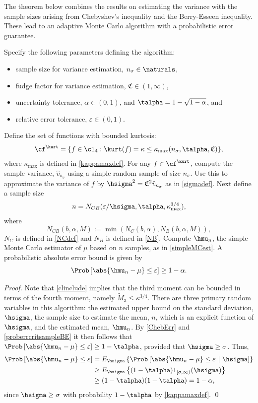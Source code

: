 \documentclass[graybox]{svmult}
\newcommand{\hv}{\hat{v}}
\newcommand{\fudge}{\mathfrak{C}}
\begin{document}
The theorem below combines the results on estimating the variance with the sample sizes arising from Chebyshev's inequality and the Berry-Esseen inequality.  These lead to an adaptive Monte Carlo algorithm with a probabilistic error guarantee.

\begin{theorem} \label{mainadaptthm} Specify the following parameters defining the algorithm:
\begin{itemize}
\item sample size for variance estimation, $n_{\sigma} \in \naturals$,
\item fudge factor for variance estimation, $\fudge \in (1,\infty)$,
\item uncertainty tolerance, $\alpha\in (0,1)$, and $\talpha = 1 - \sqrt{1 - \alpha}$, and
\item relative error tolerance, $\varepsilon \in (0,1)$. 
\end{itemize} 
Define the set of functions with bounded kurtosis:
\[
\cf^{\kurt}= \{f \in \cl_{4} : \kurt(f)= \kappa \le \kappa_{\max}(n_{\sigma},\talpha,\fudge) \},
\]
where $\kappa_{\max}$ is defined in \eqref{kappamaxdef}.  For any $f \in \cf^{\kurt}$, compute the sample variance, $\hv_{n_{\sigma}}$ using a simple random sample of size $n_{\sigma}$. Use this to approximate the variance of $f$ by $\hsigma^2 = \fudge^2 \hv_{n_{\sigma}}$ as in \eqref{sigmadef}.  Next define a sample size
\[
n = N_{CB}(\varepsilon/\hsigma,\talpha,\kappa_{\max}^{3/4}),
\]
where
\begin{equation} \label{NCBdef}
N_{CB}(b,\alpha,M) := \min\left( N_C(b,\alpha), N_B(b,\alpha,M) \right),
\end{equation} 
$N_C$ is defined in \eqref{NCdef} and  $N_B$ is defined in \eqref{NB}.  Compute $\hmu_n$, the simple Monte Carlo estimator of $\mu$ based on $n$ samples, as in \eqref{simpleMCest}.  A probabilistic absolute error bound is given by
\[
\Prob\left[\abs{\hmu_n-\mu} \le \varepsilon \right] \geq 1-\alpha.
\]
\end{theorem}
\begin{proof} Note that \eqref{clinclude} implies that the third moment can be bounded in terms of the fourth moment, namely $\widetilde{M}_3 \le \kappa^{3/4}$. There are three primary random variables in this algorithm:  the estimated upper bound on the standard deviation, $\hsigma$, the sample size to estimate the mean, $n$, which is an explicit function of $\hsigma$, and the estimated mean, $\hmu_n$. By  \eqref{ChebErr} and \eqref{proberrcritsampleBE} it then follows that  $\Prob\left[\abs{\hmu_n-\mu} \le \varepsilon \right] \geq 1-\talpha$, provided that $\hsigma  \ge \sigma$. Thus, 
\begin{align*}
\Prob\left[\abs{\hmu_n-\mu} \le \varepsilon \right] &
= E_{\hsigma} \left\{\Prob\left[\abs{\hmu_n-\mu} \le \varepsilon \ | \ \hsigma \right] \right\} \\
& \ge E_{\hsigma} \left\{(1-\talpha) 1_{[\sigma,\infty)}(\hsigma) \right\}\\
& \ge (1-\talpha) (1-\talpha) = 1-\alpha,
\end{align*}
since $\hsigma \ge \sigma$ with probability $1-\talpha$ by \eqref{kappamaxdef}.  \qed
\end{proof}
\end{document}
